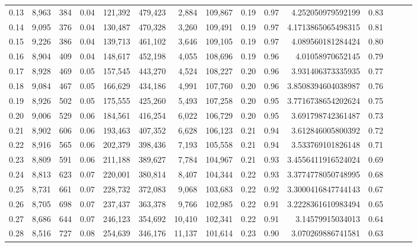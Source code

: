 \begin{tabular}{rrrrrrrrrrrrrrr}
0.13 &   8,963 &    384 &  0.04 &  121,392 &  479,423 &    2,884 &  109,867 &  0.19 &  0.97 &     4.252050979592199 &      0.83 \\
0.14 &   9,095 &    376 &  0.04 &  130,487 &  470,328 &    3,260 &  109,491 &  0.19 &  0.97 &    4.1713865065498315 &      0.81 \\
0.15 &   9,226 &    386 &  0.04 &  139,713 &  461,102 &    3,646 &  109,105 &  0.19 &  0.97 &     4.089560181284424 &      0.80 \\
0.16 &   8,904 &    409 &  0.04 &  148,617 &  452,198 &    4,055 &  108,696 &  0.19 &  0.96 &      4.01058970652145 &      0.79 \\
0.17 &   8,928 &    469 &  0.05 &  157,545 &  443,270 &    4,524 &  108,227 &  0.20 &  0.96 &     3.931406373335935 &      0.77 \\
0.18 &   9,084 &    467 &  0.05 &  166,629 &  434,186 &    4,991 &  107,760 &  0.20 &  0.96 &    3.8508394604038987 &      0.76 \\
0.19 &   8,926 &    502 &  0.05 &  175,555 &  425,260 &    5,493 &  107,258 &  0.20 &  0.95 &    3.7716738654202624 &      0.75 \\
0.20 &   9,006 &    529 &  0.06 &  184,561 &  416,254 &    6,022 &  106,729 &  0.20 &  0.95 &     3.691798742361487 &      0.73 \\
0.21 &   8,902 &    606 &  0.06 &  193,463 &  407,352 &    6,628 &  106,123 &  0.21 &  0.94 &     3.612846005800392 &      0.72 \\
0.22 &   8,916 &    565 &  0.06 &  202,379 &  398,436 &    7,193 &  105,558 &  0.21 &  0.94 &     3.533769101826148 &      0.71 \\
0.23 &   8,809 &    591 &  0.06 &  211,188 &  389,627 &    7,784 &  104,967 &  0.21 &  0.93 &    3.4556411916524024 &      0.69 \\
0.24 &   8,813 &    623 &  0.07 &  220,001 &  380,814 &    8,407 &  104,344 &  0.22 &  0.93 &    3.3774778050748995 &      0.68 \\
0.25 &   8,731 &    661 &  0.07 &  228,732 &  372,083 &    9,068 &  103,683 &  0.22 &  0.92 &    3.3000416847744143 &      0.67 \\
0.26 &   8,705 &    698 &  0.07 &  237,437 &  363,378 &    9,766 &  102,985 &  0.22 &  0.91 &    3.2228361610983494 &      0.65 \\
0.27 &   8,686 &    644 &  0.07 &  246,123 &  354,692 &   10,410 &  102,341 &  0.22 &  0.91 &      3.14579915034013 &      0.64 \\
0.28 &   8,516 &    727 &  0.08 &  254,639 &  346,176 &   11,137 &  101,614 &  0.23 &  0.90 &     3.070269886741581 &      0.63 \\

\end{tabular}
